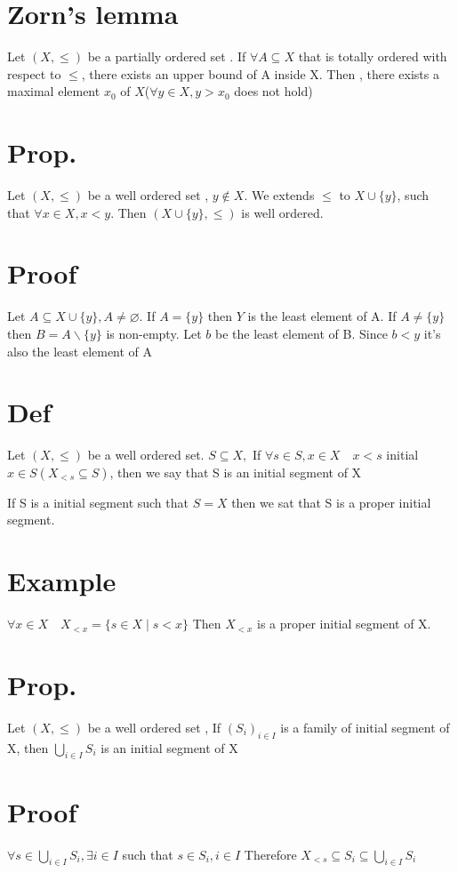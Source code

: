 \documentclass{book}
\begin{document}
\section{Zorn's lemma}
Let $(X,\leq)$ be a partially ordered set . If $\forall A\subseteq X$ that is totally ordered with respect to $\leq $, there exists an upper bound of A inside X. Then , there exists a maximal element $x_0$ of $X$($\forall y\in X, y>x_0$ does not hold)
\section{Prop.}
Let $(X,\leq)$ be a well ordered set , $y\not\in X. $ We extends $\leq$ to $X\cup\{y\}$, such that $\forall x\in X,x<y.$ Then $(X\cup\{y\},\leq)$ is well ordered.
\section{Proof}
Let $A\subseteq X\cup\{y\},A\not=\varnothing$. If $A=\{y\}$ then $Y$ is the least element of A. If $A\not=\{y\}$ then $B=A\backslash\{y\}$ is non-empty. Let $b$ be the least element of B. Since $b<y$ it's also the least element of A
\section{Def}
Let $(X,\leq)$ be a well ordered set. $S\subseteq X,$ If $\forall s\in S,x\in X\quad x<s$ initial $x\in S(X_{<s}\subseteq S)$, then we say that S is an initial segment of X

If S is a initial segment such that $S=X$ then we sat that S is a proper initial segment.
\section{Example}$\forall x\in X\quad X_{<x}=\{s\in X\mid s<x\}$ Then $X_{<x}$ is a proper initial segment of X.
\section{Prop.}Let $(X,\leq)$ be a well ordered set , If $(S_i)_{i\in I}$ is a family of initial segment of X, then $\bigcup\limits_{i\in I}S_i$ is an initial segment of X
\section{Proof}
$\forall s\in \bigcup\limits_{i\in I}S_i,\exists i\in I$ such that $s\in S_i,i\in I$ Therefore $X_{<s}\subseteq S_i\subseteq\bigcup\limits_{i\in I}S_i$
\end{document}
